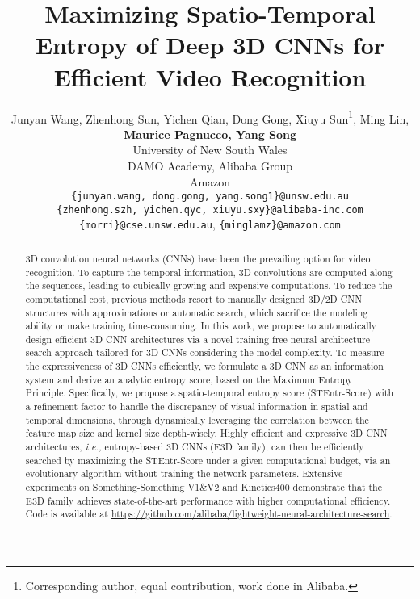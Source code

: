 \documentclass{article} \usepackage{iclr2023_conference,times}
\title{Maximizing Spatio-Temporal Entropy of Deep 3D CNNs for Efficient Video Recognition}
\author{Junyan Wang, Zhenhong Sun, Yichen Qian, Dong Gong, Xiuyu Sun\thanks{Corresponding author, equal contribution, work done in Alibaba.}, Ming Lin, \\ \textbf{Maurice Pagnucco, Yang Song}\\
University of New South Wales \\
DAMO Academy, Alibaba Group \\
Amazon \\
\texttt{\{junyan.wang, dong.gong, yang.song1\}@unsw.edu.au}\\
\texttt{\{zhenhong.szh, yichen.qyc, xiuyu.sxy\}@alibaba-inc.com}\\
\texttt{\{morri\}@cse.unsw.edu.au}, \texttt{\{minglamz\}@amazon.com}}
\def\ie{\emph{i.e., }}
\begin{document}
\maketitle

\begin{abstract}
3D convolution neural networks (CNNs) have been the prevailing option for video recognition. To capture the temporal information, 3D convolutions are computed along the sequences, leading to cubically growing and expensive computations. To reduce the computational cost, previous methods resort to manually designed 3D/2D CNN structures with approximations or automatic search, which sacrifice the modeling ability or make training time-consuming. In this work, we propose to automatically design efficient 3D CNN architectures via a novel training-free neural architecture search approach tailored for 3D CNNs considering the model complexity. To measure the expressiveness of 3D CNNs efficiently, we formulate a 3D CNN as an information system and derive an analytic entropy score, based on the Maximum Entropy Principle. Specifically, we propose a spatio-temporal entropy score (STEntr-Score) with a refinement factor to handle the discrepancy of visual information in spatial and temporal dimensions, 
through dynamically leveraging the correlation between the feature map size and kernel size depth-wisely.
Highly efficient and expressive 3D CNN architectures, \ie entropy-based 3D CNNs (E3D family),  can then be efficiently searched by maximizing the STEntr-Score under a given computational budget, via an evolutionary algorithm without training the network parameters. Extensive experiments on Something-Something V1\&V2 and Kinetics400 demonstrate that the E3D family achieves state-of-the-art performance with higher computational efficiency.
Code is available at \url{https://github.com/alibaba/lightweight-neural-architecture-search}.











\end{abstract}
\vspace{-0.5em}
\end{document}
